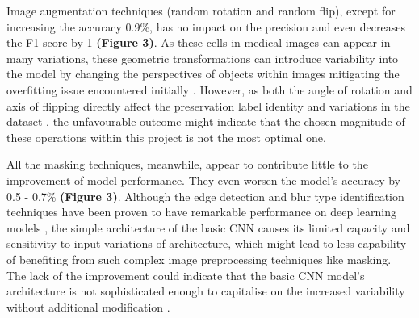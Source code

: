 \documentclass[letterpaper,9pt,twocolumn,twoside,]{pinp}
\begin{document}
Image augmentation techniques (random rotation and random flip), except
for increasing the accuracy 0.9\%, has no impact on the precision and
even decreases the F1 score by 1 \textbf{(Figure 3)}. As these cells in
medical images can appear in many variations, these geometric
transformations can introduce variability into the model by changing the
perspectives of objects within images mitigating the overfitting issue
encountered initially \citep{xu2023comprehensive}. However, as both the
angle of rotation and axis of flipping directly affect the preservation
label identity and variations in the dataset
\citep{xu2023comprehensive}, the unfavourable outcome might indicate
that the chosen magnitude of these operations within this project is not
the most optimal one.

All the masking techniques, meanwhile, appear to contribute little to
the improvement of model performance. They even worsen the model's
accuracy by 0.5 - 0.7\% \textbf{(Figure 3)}. Although the edge detection
and blur type identification techniques have been proven to have
remarkable performance on deep learning models
\citep[\citet{guo2021non}]{wang2017blur}, the simple architecture of the
basic CNN causes its limited capacity and sensitivity to input
variations of architecture, which might lead to less capability of
benefiting from such complex image preprocessing techniques like
masking. The lack of the improvement could indicate that the basic CNN
model's architecture is not sophisticated enough to capitalise on the
increased variability without additional modification
\citep{tuggener2022enough}.
\end{document}
